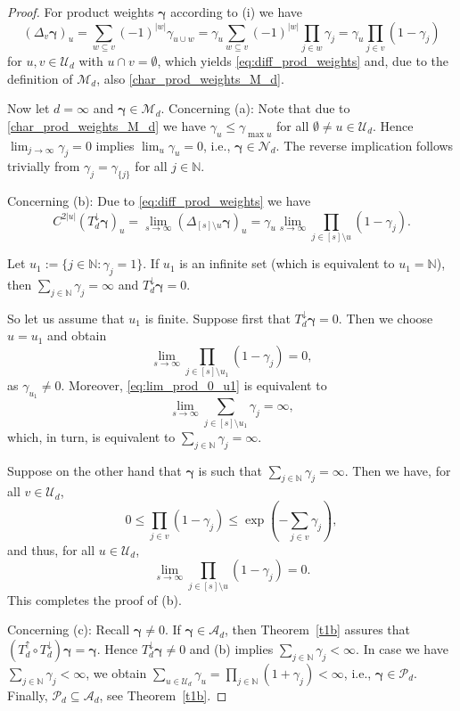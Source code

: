 \documentclass{article}
\newcommand{\N}  {{\mathbb N}}
\newcommand{\bg}{{\boldsymbol{\gamma}}}
\newcommand{\PP} {\mathcal{P}}
\newcommand{\U}  {\mathcal{U}}
\newcommand{\M}  {\mathcal{M}}
\newcommand{\mN}  {\mathcal{N}}
\newcommand{\A}{\mathcal{A}}
\newcommand{\lo}{\downarrow}
\newcommand{\up}{\uparrow}
\theoremstyle{plain}
\theoremstyle{definition}
\begin{document}
\begin{proof}
For product weights $\bg$ according to (i) we have
\[
\left(\Delta_v \bg\right)_u 
= \sum_{w\subseteq v} (-1)^{|w|} \gamma_{u\cup w}
= \gamma_{u} \sum_{w\subseteq v} (-1)^{|w|} \prod_{j\in w} \gamma_{ j}
= \gamma_{u} \prod_{j\in v} (1 - \gamma_{j})
\]
for $u, v\in \U_d$ with $u\cap v = \emptyset$, which yields 
\eqref{eq:diff_prod_weights} and, due to the definition of $\M_d$, 
also \eqref{char_prod_weights_M_d}.

Now let $d=\infty$ and $\bg \in \M_d$. Concerning (a): Note that due 
to \eqref{char_prod_weights_M_d} we have $\gamma_u \le \gamma_{\max u}$ 
for all $\emptyset \neq u\in \U_d$. Hence 
$\lim_{j \to \infty} \gamma_j = 0$ implies 
$\lim_u \gamma_u = 0$, i.e., $\bg \in \mN_d$.  
The reverse implication follows trivially from 
$\gamma_j = \gamma_{\{j\}}$ for all $j\in\N$.

Concerning (b): Due to
\eqref{eq:diff_prod_weights} we have
\begin{equation*}
C^{2|u|} \left( T^\lo_d \bg \right)_u = 
\lim_{s\to \infty} \left( \Delta_{[s] \setminus u} \bg \right)_u
= 
\gamma_u \lim_{s\to \infty} \prod_{j\in [s]\setminus u} (1-\gamma_j).
\end{equation*}

Let $u_1 := \{ j \in \N : \gamma_j = 1\}$.
If $u_1$ is an infinite set (which is equivalent to $u_1 = \N$), then
$\sum_{j\in\N} \gamma_j = \infty$ and $T^\lo_d \bg=0$.

So let us assume that $u_1$ is finite.
Suppose first that $T^\lo_d \bg=0$. Then we choose $u=u_1$ and obtain
\begin{equation}\label{eq:lim_prod_0_u1}
\lim_{s\to \infty} \prod_{j\in [s]\setminus u_1} (1- \gamma_j) = 0,
\end{equation}
as $\gamma_{u_1}\neq 0$. Moreover, 
\eqref{eq:lim_prod_0_u1} is equivalent to
\[
 \lim_{s\to \infty} \sum_{j\in [s]\setminus u_1} \gamma_j = \infty,
\]
which, in turn, is equivalent to $\sum_{j\in\N} \gamma_j =\infty$. 

Suppose on the other hand that $\bg$ is such that 
$\sum_{j\in\N} \gamma_j =\infty$. Then we have, for all $v\in \U_d$,
\[
 0 \le \prod_{j\in v} (1-\gamma_j) \le 
\exp \left(-\sum_{j\in v}\gamma_j\right), 
\]
and thus, for all $u\in\U_d$, 
\[
 \lim_{s\to \infty} \prod_{j\in [s]\setminus u} (1- \gamma_j) = 0.
\]
This completes the proof of (b).

Concerning (c): Recall $\bg \neq 0$. If 
$\bg \in \A_d$, then Theorem~\ref{t1b}
assures that $\left(T^\up_d \circ T^\lo_d \right) \bg = \bg$. 
Hence $T^\lo_d \bg \neq 0$ and (b) implies 
$\sum_{j\in\N} \gamma_j < \infty$. In case we have 
$\sum_{j\in\N} \gamma_j < \infty$, we obtain 
$\sum_{u\in \U_d} \gamma_u  = 
\prod_{j\in\N} (1 + \gamma_j) < \infty$, 
i.e., $\bg \in \PP_d$. Finally, $\PP_d \subseteq
\A_d$, see Theorem~\ref{t1b}.
\end{proof}
\end{document}
